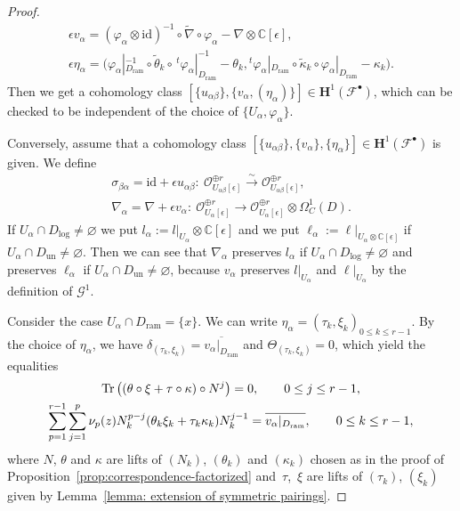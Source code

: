 \documentclass[pdftex]{sigma}
\numberwithin{equation}{section}
\newcommand{\Tr}{\mathop{\rm Tr}\nolimits}
\begin{document}
\begin{proof}
\begin{gather*}
 \epsilon v_{\alpha}=
 (\varphi_{\alpha}\otimes\mathrm{id})^{-1}
 \circ\tilde{\nabla}\circ\varphi_{\alpha}-\nabla\otimes\mathbb{C}[\epsilon], \\
 \epsilon \eta_{\alpha}
 =
 \big(
 \varphi_{\alpha}|_{D_{\mathrm{ram}}}^{-1}\circ\tilde{\theta}_k
 \circ \,^t\varphi_{\alpha}|_{D_{\mathrm{ram}}}^{-1}
 -\theta_k ,
 {}^t\varphi_{\alpha}|_{D_{\mathrm{ram}}}\circ\tilde{\kappa}_k
 \circ\varphi_{\alpha}|_{D_{\mathrm{ram}}}
 -\kappa_k \big).
\end{gather*}
Then we get a cohomology class
$[ \{u_{\alpha\beta}\}, \{ v_{\alpha} , (\eta_{\alpha}) \} ]
\in \mathbf{H}^1({\mathcal F}^{\bullet})$,
which can be checked to be independent of the choice of
$\{U_{\alpha},\varphi_{\alpha}\}$.

Conversely, assume that a cohomology class
$[ \{u_{\alpha\beta}\}, \{ v_{\alpha} \} , \{ \eta_{\alpha} \} ]
\in \mathbf{H}^1({\mathcal F}^{\bullet})$
is given.
We define
\begin{gather}
 \sigma_{\beta\alpha}
=
 \mathrm{id}+\epsilon u_{\alpha\beta}
 \colon \
 {\mathcal O}_{U_{\alpha\beta}[\epsilon]}^{\oplus r}
 \stackrel{\sim}\longrightarrow
 {\mathcal O}_{U_{\alpha\beta}[\epsilon]}^{\oplus r},\nonumber \\
 \nabla_{\alpha}
 =\nabla+\epsilon v_{\alpha}
 \colon \
 {\mathcal O}_{U_{\alpha}[\epsilon]}^{\oplus r}
 \longrightarrow
 {\mathcal O}_{U_{\alpha}[\epsilon]}^{\oplus r}
 \otimes\Omega^1_C(D).\label{equation: local patching of bundle isomorphism}
\end{gather}
If $U_{\alpha}\cap D_{\mathrm{log}}\neq\varnothing$
we put
$l_{\alpha}:=l|_{U_{\alpha}}\otimes\mathbb{C}[\epsilon]$
and we put
$\ell_{\alpha}:=\ell|_{U_{\alpha}\otimes\mathbb{C}[\epsilon]}$
if $U_{\alpha}\cap D_{\mathrm{un}}\neq\varnothing$.
Then we can see that
$\nabla_{\alpha}$ preserves $l_{\alpha}$
if $U_{\alpha}\cap D_{\mathrm{log}}\neq\varnothing$
and preserves $\ell_{\alpha}$
if $U_{\alpha}\cap D_{\mathrm{un}}\neq\varnothing$,
because $v_{\alpha}$ preserves $l|_{U_{\alpha}}$ and $\ell|_{U_{\alpha}}$ by the definition of
${\mathcal G}^1$.

Consider the case
 $U_{\alpha}\cap D_{\mathrm{ram}}=\{x\}$.
We can write
$\eta_{\alpha}=(\tau_k,\xi_k)_{0\leq k\leq r-1}$.
By the choice of $\eta_{\alpha}$, we have
$\delta_{(\tau_k,\xi_k)}=\overline{v_{\alpha}|_{D_{\mathrm{ram}}}}$ and
$\Theta_{(\tau_k,\xi_k)}=0$,
which yield the equalities
\begin{gather}
 \Tr \left( (\theta\circ\xi+\tau\circ\kappa)\circ N^j \right)=0,
 \qquad 0\leq j\leq r-1, \nonumber
 \\
 \sum_{p=1}^{r-1}\sum_{j=1}^p \nu_p(z) N_k^{p-j}(\theta_k\xi_k+\tau_k\kappa_k)N_k^{j-1}
 =\overline { v_{\alpha}|_{D_{\mathrm{ram}}} }, \qquad 0\leq k\leq r-1, \label{condition in G^1}
\end{gather}
where $N$, $\theta$ and $\kappa$ are lifts of $(N_k)$, $(\theta_k)$ and $(\kappa_k)$
chosen as in the proof of Proposition~\ref{prop:correspondence-factorized}
and~$\tau$,~$\xi$ are lifts of $(\tau_k)$, $(\xi_k)$
given by Lemma~\ref{lemma: extension of symmetric pairings}.


\end{proof}
\end{document}
